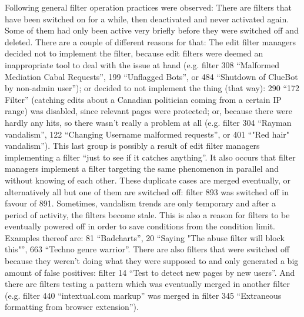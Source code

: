 Following general filter operation practices were observed:
There are filters that have been switched on for a while, then deactivated and never activated again.
Some of them had only been active very briefly before they were switched off and deleted.
There are a couple of different reasons for that:
The edit filter managers decided not to implement the filter, because edit filters were deemed an inappropriate tool to deal with the issue at hand (e.g. filter 308 ``Malformed Mediation Cabal Requests'', 199 ``Unflagged Bots'', or 484 ``Shutdown of ClueBot by non-admin user'');
or decided to not implement the thing (that way): 290 ``172 Filter'' (catching edits about a Canadian politician coming from a certain IP range) was disabled, since relevant pages were protected;
or, because there were hardly any hits, so there wasn't really a problem at all (e.g. filter 304 ``Rayman vandalism'', 122 ``Changing Username malformed requests'', or 401 ``"Red hair" vandalism'').
This last group is possibly a result of edit filter managers implementing a filter ``just to see if it catches anything''.
It also occurs that filter managers implement a filter targeting the same phenomenon in parallel and without knowing of each other.
These duplicate cases are merged eventually, or alternatively all but one of them are switched off: filter 893 was switched off in favour of 891.
Sometimes, vandalism trends are only temporary and after a period of activity, the filters become stale.
This is also a reason for filters to be eventually powered off in order to save conditions from the condition limit.
Examples thereof are: 81 ``Badcharts'', 20 ``Saying "The abuse filter will block this"'', 663 ``Techno genre warrior''.
There are also filters that were switched off because they weren't doing what they were supposed to and only generated a big amount of false positives: filter 14 ``Test to detect new pages by new users''.
And there are filters testing a pattern which was eventually merged in another filter (e.g. filter 440 ``intextual.com markup'' was merged in filter 345 ``Extraneous formatting from browser extension'').

